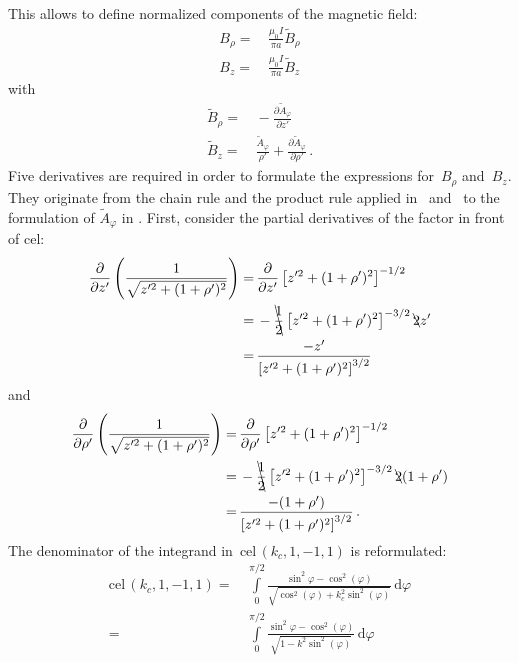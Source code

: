 This allows to define normalized components of the magnetic field:
\begin{align}
  B_\rho =&\, \frac{\mu_0 I}{\pi a} \tilde{B}_\rho \\
  B_z    =&\, \frac{\mu_0 I}{\pi a} \tilde{B}_z
\end{align}
with
\begin{align}
  \tilde{B}_\rho =&\, - \frac{\partial \tilde{A}_\varphi}{\partial z'}                                    \label{eqn:cwl_norm_B_rho} \\
  \tilde{B}_z    =&\, \frac{\tilde{A}_\varphi}{\rho'} + \frac{\partial \tilde{A}_\varphi}{\partial \rho'} \label{eqn:cwl_norm_B_z}   \, .
\end{align}
Five derivatives are required in order to formulate the expressions for~$B_\rho$ and~$B_z$.
They originate from the chain rule and the product rule applied in~ and~
to the formulation of $\tilde{A}_\varphi$ in .
First, consider the partial derivatives of the factor in front of cel:
\begin{align}
      \frac{\partial}{\partial z'} \left( \frac{1}{\sqrt{z'^2 + (1 + \rho')^2}} \right)
 =&\, \frac{\partial}{\partial z'} \left[ z'^2 + (1 + \rho')^2 \right]^{-1/2} \nonumber \\
 =&\, - \bcancel{\frac{1}{2}} \left[ z'^2 + (1 + \rho')^2 \right]^{-3/2} \bcancel{2} z' \nonumber \\
 =&\, \frac{- z'}{\left[ z'^2 + (1 + \rho')^2 \right]^{3/2} }
\end{align}
and
\begin{align}
      \frac{\partial}{\partial \rho'} \left( \frac{1}{\sqrt{z'^2 + (1 + \rho')^2}} \right)
 =&\, \frac{\partial}{\partial \rho'} \left[ z'^2 + (1 + \rho')^2 \right]^{-1/2} \nonumber \\
 =&\, - \bcancel{\frac{1}{2}} \left[ z'^2 + (1 + \rho')^2 \right]^{-3/2} \bcancel{2} (1 + \rho') \nonumber \\
 =&\, \frac{- (1 + \rho')}{\left[ z'^2 + (1 + \rho')^2 \right]^{3/2} } \, .
\end{align}
The denominator of the integrand in~$\textrm{cel}\,(k_c, 1, -1, 1)$ is reformulated:
\begin{align}
  \textrm{cel}\,(k_c, 1, -1, 1)
 =&\, \int\limits_0^{\pi/2} \frac{\sin^2{\varphi} - \cos^2(\varphi)}{\sqrt{\cos^2(\varphi) + k_c^2 \sin^2(\varphi)}} \,\mathrm{d}\varphi \nonumber \\
 =&\, \int\limits_0^{\pi/2} \frac{\sin^2{\varphi} - \cos^2(\varphi)}{\sqrt{1 - k^2 \sin^2(\varphi)}} \,\mathrm{d}\varphi
\end{align}
